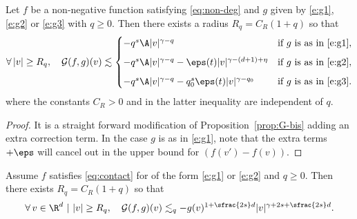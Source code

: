 \begin{prop} \label{prop:G-bis2} Let $f$ be a non-negative function satisfying \eqref{eq:non-deg} and $g$
given by \eqref{e:g1}, \eqref{e:g2} or \eqref{e:g3} with $q \ge
0$. Then there exists a radius $R_q = C_R (1+q)$ so that
\[
\forall \, |v| \geq R_q, \quad
\mathcal{G} (f,g)(v)
\lesssim \begin{cases}
- q^s \A |v|^{\gamma-q} & \text{if $g$ is as in \eqref{e:g1}}, \\[2mm]
- q^s \A |v|^{\gamma-q} - \eps(t) |v|^{\gamma-(d+1)+\eta} & \text{if $g$ is as in \eqref{e:g2}}, \\[2mm]
- q^s \A |v|^{\gamma-q} - q_0^s \eps(t) |v|^{\gamma-q_0} & \text{if $g$ is as in \eqref{e:g3}}.
\end{cases}
\]
where the constants $C_R >0$ and in the latter inequality are
independent of $q$.
\end{prop}

\begin{proof} It is a straight forward modification of
Proposition~\ref{prop:G-bis} adding an extra correction term. In the
case $g$ is as in \eqref{e:g1}, note that the extra terms $+\eps$
will cancel out in the upper bound for $(f(v') - f(v))$.
\end{proof}

\begin{prop} \label{prop:G2} Assume $f$ satisfies \eqref{eq:contact} for of
the form \eqref{e:g1} or \eqref{e:g2} and $q \ge 0$. Then there
exists $R_q=C_R(1+q)$ so that
\[ \forall \, v \in \R^d \ | \ |v| \ge R_q, \quad \mathcal{G}
(f,g)(v) \lesssim_q - g(v)^{1+\sfrac{2s}d}
|v|^{\gamma+2s+\sfrac{2s}d}.
\]
\end{prop}

